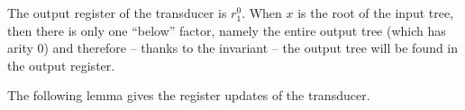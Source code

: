 The output register of the transducer is $r_1^0$. When $x$ is the root of the input tree, then there is only one ``below'' factor, namely the entire output tree (which has arity $0$) and therefore -- thanks to the invariant -- the output tree will be found in the output register. 

The following lemma gives the  register updates of the transducer. 



